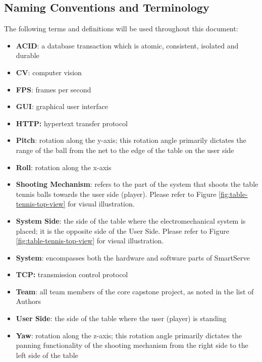 \documentclass[11pt]{article}
\begin{document}
\subsection{Naming Conventions and Terminology}
\label{sec:definitions}
The following terms and definitions will be used throughout this document:
\begin{itemize}
\item \textbf{ACID}: a database transaction which is atomic, consistent, isolated and durable
\item \textbf{CV}: computer vision
\item \textbf{FPS}: frames per second
\item \textbf{GUI}: graphical user interface
\item \textbf{HTTP:} hypertext transfer protocol
\item \textbf{Pitch}: rotation along the y-axis; this rotation angle primarily dictates the range of the ball from the net to the edge of the table on the user side
\item \textbf{Roll}: rotation along the x-axis
\item \textbf{Shooting Mechanism}: refers to the part of the system that shoots the table tennis balls towards the user side (player). Please refer to Figure \ref{fig:table-tennis-top-view} for visual illustration.
\item \textbf{System Side}: the side of the table where the electromechanical system is placed; it is the opposite side of the User Side. Please refer to Figure \ref{fig:table-tennis-top-view} for visual illustration.
\item \textbf{System}: encompasses both the hardware and software parts of SmartServe
\item \textbf{TCP:} transmission control protocol
\item \textbf{Team}: all team members of the core capstone project, as noted in the list of Authors
\item \textbf{User Side}: the side of the table where the user (player) is standing
\item \textbf{Yaw}: rotation along the z-axis; this rotation angle primarily dictates the panning functionality of the shooting mechanism from the right side to the left side of the table
\end{itemize}
\end{document}
